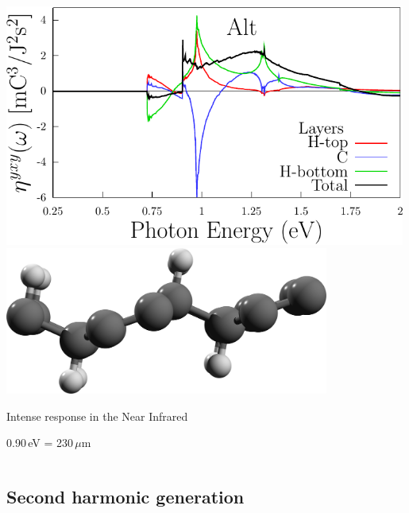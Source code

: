 \documentclass{beamer}
\begin{document}
\begin{frame}
\begin{columns}
\begin{center}
\includegraphics[width=0.99\textwidth]{figs/plots/eta-alt_y.pdf}
\vspace{3mm}
\includegraphics[width=0.8\textwidth]{figs/alt2.png}

Intense response in the Near Infrared

0.90\,eV = 230\,$\mu$m

\end{center}

\end{columns}

\end{frame}



\subsection{Second harmonic generation}
\end{document}
